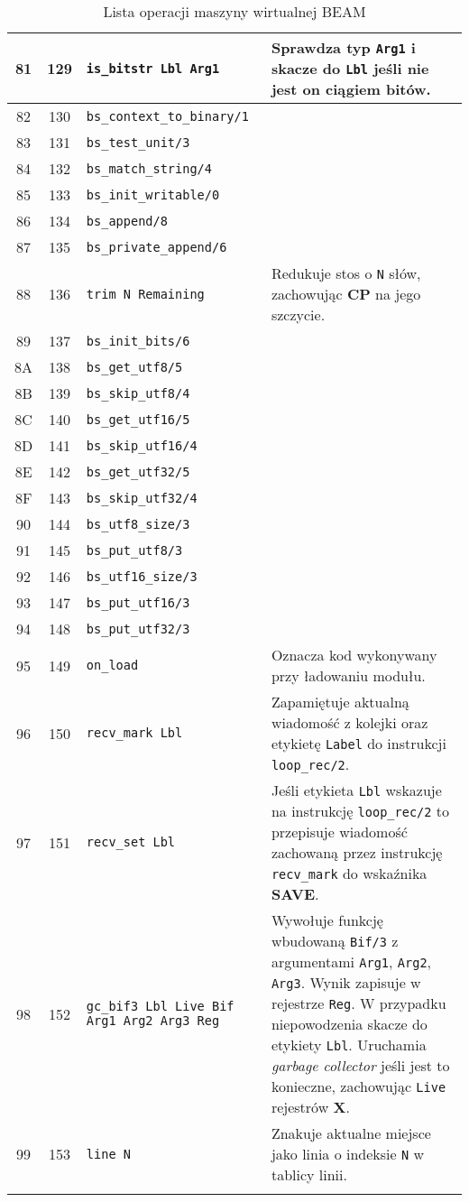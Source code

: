 \begin{longtable}{|c|c|p{5cm}|p{7cm}|}
\hline
81 & 129 & \texttt{is\_bitstr Lbl Arg1} & Sprawdza typ \texttt{Arg1} i skacze do \texttt{Lbl} jeśli nie jest on ciągiem bitów.\\
\hline
82 & 130 & \texttt{bs\_context\_to\_binary/1} & \\
\hline
83 & 131 & \texttt{bs\_test\_unit/3} & \\
\hline
84 & 132 & \texttt{bs\_match\_string/4} & \\
\hline
85 & 133 & \texttt{bs\_init\_writable/0} & \\
\hline
86 & 134 & \texttt{bs\_append/8} & \\
\hline
87 & 135 & \texttt{bs\_private\_append/6} & \\
\hline
88 & 136 & \texttt{trim N Remaining} & Redukuje stos o \texttt{N} słów, zachowując \textbf{CP} na jego szczycie.\\
\hline
89 & 137 & \texttt{bs\_init\_bits/6} & \\
\hline
8A & 138 & \texttt{bs\_get\_utf8/5} & \\
\hline
8B & 139 & \texttt{bs\_skip\_utf8/4} & \\
\hline
8C & 140 & \texttt{bs\_get\_utf16/5} & \\
\hline
8D & 141 & \texttt{bs\_skip\_utf16/4} & \\
\hline
8E & 142 & \texttt{bs\_get\_utf32/5} & \\
\hline
8F & 143 & \texttt{bs\_skip\_utf32/4} & \\
\hline
90 & 144 & \texttt{bs\_utf8\_size/3} & \\
\hline
91 & 145 & \texttt{bs\_put\_utf8/3} & \\
\hline
92 & 146 & \texttt{bs\_utf16\_size/3} & \\
\hline
93 & 147 & \texttt{bs\_put\_utf16/3} & \\
\hline
94 & 148 & \texttt{bs\_put\_utf32/3} & \\
\hline
95 & 149 & \texttt{on\_load} & Oznacza kod wykonywany przy ładowaniu modułu.\\
\hline
96 & 150 & \texttt{recv\_mark Lbl} & Zapamiętuje aktualną wiadomość z kolejki oraz etykietę \texttt{Label} do instrukcji \texttt{loop\_rec/2}.\\
\hline
97 & 151 & \texttt{recv\_set Lbl} & Jeśli etykieta \texttt{Lbl} wskazuje na instrukcję \texttt{loop\_rec/2} to przepisuje wiadomość zachowaną przez instrukcję \texttt{recv\_mark} do wskaźnika \textbf{SAVE}. \\
\hline
98 & 152 & \texttt{gc\_bif3 Lbl Live Bif Arg1 Arg2 Arg3 Reg} & Wywołuje funkcję wbudowaną \texttt{Bif/3} z argumentami \texttt{Arg1}, \texttt{Arg2}, \texttt{Arg3}. Wynik zapisuje w rejestrze \texttt{Reg}. W przypadku niepowodzenia skacze do etykiety \texttt{Lbl}. Uruchamia \emph{garbage collector} jeśli jest to konieczne, zachowując \texttt{Live} rejestrów \textbf{X}. \\
\hline
99 & 153 & \texttt{line N} & Znakuje aktualne miejsce jako linia o indeksie \texttt{N} w tablicy linii.\\
\hline


\caption{Lista operacji maszyny wirtualnej BEAM} 
\label{tab:ops} \\
\end{longtable}